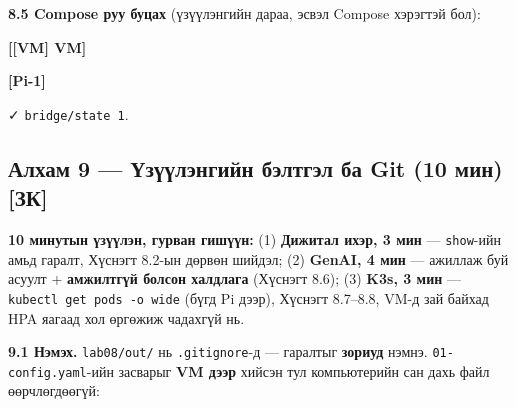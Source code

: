 \textbf{8.5 Compose руу буцах} (үзүүлэнгийн дараа, эсвэл Compose хэрэгтэй бол):

\textbf{{[}{[}VM{]} VM{]}}

\begin{Shaded}
\begin{Highlighting}[]
\KeywordTok{\&\&} \KeywordTok{\&\&} \OperatorTok{\textless{}}\OperatorTok{\textgreater{}}
\end{Highlighting}
\end{Shaded}

\textbf{{[}Pi-1{]}}

\begin{Shaded}
\begin{Highlighting}[]
\KeywordTok{\&\&} \KeywordTok{\&\&} 
\end{Highlighting}
\end{Shaded}

✓ \texttt{bridge/state\ 1}.

\hypertarget{ux430ux43bux445ux430ux43c-9-ux4afux437ux4afux4afux43bux44dux43dux433ux438ux439ux43d-ux431ux44dux43bux442ux433ux44dux43b-ux431ux430-git-10-ux43cux438ux43d-ux437ux43a}{%
\subsection{Алхам 9 --- Үзүүлэнгийн бэлтгэл ба Git (10 мин) {[}ЗК{]}}\label{ux430ux43bux445ux430ux43c-9-ux4afux437ux4afux4afux43bux44dux43dux433ux438ux439ux43d-ux431ux44dux43bux442ux433ux44dux43b-ux431ux430-git-10-ux43cux438ux43d-ux437ux43a}}

\textbf{10 минутын үзүүлэн, гурван гишүүн:} (1) \textbf{Дижитал ихэр, 3 мин} --- \texttt{show}-ийн амьд гаралт, Хүснэгт 8.2-ын дөрвөн шийдэл; (2) \textbf{GenAI, 4 мин} --- ажиллаж буй асуулт + \textbf{амжилтгүй болсон халдлага} (Хүснэгт 8.6); (3) \textbf{K3s, 3 мин} --- \texttt{kubectl\ get\ pods\ -o\ wide} (бүгд Pi дээр), Хүснэгт 8.7--8.8, VM-д зай байхад HPA яагаад хол өргөжиж чадахгүй нь.

\textbf{9.1 Нэмэх.} \texttt{lab08/out/} нь \texttt{.gitignore}-д --- гаралтыг \textbf{зориуд} нэмнэ. \texttt{01-config.yaml}-ийн засварыг \textbf{VM дээр} хийсэн тул компьютерийн сан дахь файл өөрчлөгдөөгүй:

